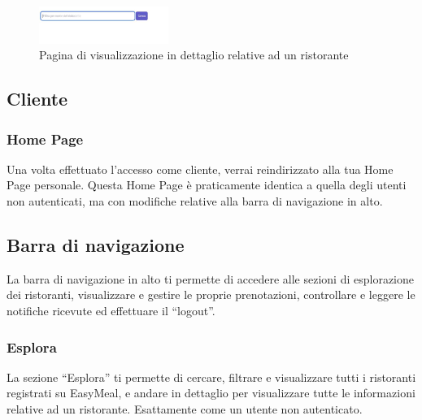 \begin{figure}[htbp]
    \centering
    \includegraphics[width=0.375\textwidth]{./img/VisualizzaDettagliRistorante.jpg}
    \caption{Pagina di visualizzazione in dettaglio relative ad un ristorante}
\end{figure}























\subsection{Cliente} %

 
\subsubsection{Home Page}
Una volta effettuato l'accesso come cliente, verrai reindirizzato alla tua Home Page personale.
Questa Home Page è praticamente identica a quella degli utenti non autenticati, ma con modifiche 
relative alla barra di navigazione in alto. 


\subsection{Barra di navigazione}
La barra di navigazione in alto ti permette di accedere alle sezioni di esplorazione dei ristoranti, 
visualizzare e gestire le proprie prenotazioni, controllare e leggere le notifiche ricevute ed effettuare il ``logout''.

\subsubsection{Esplora}
La sezione ``Esplora'' ti permette di cercare, filtrare e visualizzare tutti i ristoranti registrati su EasyMeal, 
e andare in dettaglio per visualizzare tutte le informazioni relative ad un ristorante. Esattamente come un utente non autenticato.

